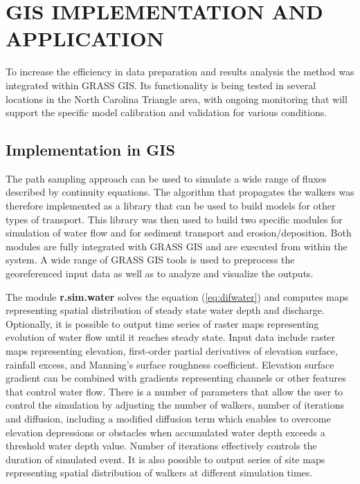 \documentclass[fleqn,12pt,twoside]{article}
\begin{document}
\section{GIS IMPLEMENTATION AND APPLICATION}

To increase the efficiency in data preparation and results analysis 
the method was integrated within GRASS GIS. Its functionality is being tested 
in several locations in the North Carolina Triangle area, with ongoing
monitoring that will support the specific model calibration and validation
for various conditions.

\subsection{Implementation in GIS}

The path sampling approach can be used to simulate a wide range of fluxes
described by continuity equations. The algorithm that propagates the walkers
was therefore implemented as a library that can be used to build
models for other types of transport. This library was then used to
build two specific modules for simulation of water flow
and for sediment transport and erosion/deposition.
Both modules are fully integrated with GRASS GIS
and are executed from within the system. A wide range of
GRASS GIS tools is used to preprocess the georeferenced input data as well as to
analyze and visualize the outputs.

The module {\bf r.sim.water} solves the equation (\ref{eq:difwater})
and computes maps representing spatial distribution of
steady state water depth and discharge. Optionally, it is possible to output
time series of raster maps representing evolution of water flow until it
reaches steady state.
Input data include raster maps representing elevation, first-order partial 
derivatives of elevation surface, rainfall excess, 
and  Manning's surface roughness coefficient.  
Elevation surface gradient can be combined with gradients representing 
channels or other features that control water flow.
There is a number of parameters that allow the user to control
the simulation by adjusting the number of walkers, number of iterations and diffusion,
including a modified diffusion term which enables
to overcome elevation depressions or obstacles when accumulated water depth exceeds
a threshold water depth value. Number of iterations effectively 
controls the duration of simulated event.
It is also possible to output series of site maps representing 
spatial distribution of walkers at different simulation times.
\end{document}
